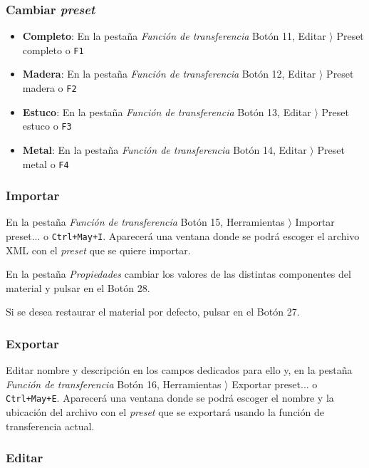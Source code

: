 \subsubsection{Cambiar \textit{preset}}

\begin{itemize}
	\item \textbf{Completo}: En la pestaña \textit{Función de transferencia} Botón 11, Editar $ \rangle $ Preset completo o \texttt{F1}
	\item \textbf{Madera}: En la pestaña \textit{Función de transferencia} Botón 12, Editar $ \rangle $ Preset madera o \texttt{F2}
	\item \textbf{Estuco}: En la pestaña \textit{Función de transferencia} Botón 13, Editar $ \rangle $ Preset estuco o \texttt{F3}
	\item \textbf{Metal}: En la pestaña \textit{Función de transferencia} Botón 14, Editar $ \rangle $ Preset metal o \texttt{F4}
\end{itemize}

\subsubsection{Importar}

En la pestaña \textit{Función de transferencia} Botón 15, Herramientas $ \rangle $ Importar preset... o \texttt{Ctrl+May+I}. Aparecerá una ventana donde se podrá escoger el archivo XML con el \textit{preset} que se quiere importar.

En la pestaña \textit{Propiedades} cambiar los valores de las distintas componentes del material y pulsar en el Botón 28.

Si se desea restaurar el material por defecto, pulsar en el Botón 27.

\subsubsection{Exportar}

Editar nombre y descripción en los campos dedicados para ello y, en la pestaña \textit{Función de transferencia} Botón 16, Herramientas $ \rangle $ Exportar preset... o \texttt{Ctrl+May+E}. Aparecerá una ventana donde se podrá escoger el nombre y la ubicación del archivo con el \textit{preset} que se exportará usando la función de transferencia actual.

\subsubsection{Editar}
 
